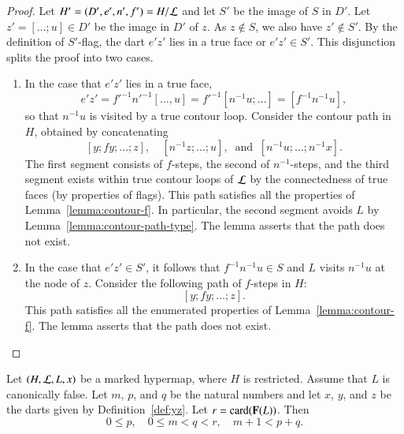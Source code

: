 \begin{proof}
  Let $H' = (D',e',n',f') = H/{\cal L}$ and let $S'$ be the image of
  $S$ in $D'$.  Let $z' = [\ldots;u]\in D'$ be the image in $D'$ of
  $z$.  As $z\not\in S$, we also have $z'\not\in S'$.  By the
  definition of $S'$-flag, the dart $e'z'$ lies in a true face or
  $e'z'\in S'$.  This disjunction splits the proof into two
  cases.
\begin{enumerate}
\item In the case that $e'z'$ lies in a true face, 
\[ 
e'z' = {f'}^{-1} {n'}^{-1} [\ldots,u] = {f'}^{-1} [n^{-1}u;\ldots]=[f^{-1}n^{-1}u],
\] 
so that $n^{-1} u$ is visited by a true contour loop.
Consider the contour
path in $H$, obtained by concatenating
\[ 
[y;fy;\ldots;z],\quad [n^{-1}z;\ldots;u],~\text{ and } ~ [n^{-1} u;\ldots;n^{-1} x].
\] 
The first segment consists of $f$-steps, the second of $n^{-1}$-steps,
and the third segment exists within true contour loops of ${\cal L}$
by the connectedness of true faces (by properties of flags).  This
path satisfies all the properties of Lemma~\ref{lemma:contour-f}.
In particular, the second segment avoids $L$ by Lemma~\ref{lemma:contour-path-type}.  
The lemma asserts that the path does not exist.
\item 
In the case that $e'z'\in S'$,  it follows that
$f^{-1}n^{-1}u \in S$ and $L$ visits $n^{-1} u$ at the node of $z$.
Consider the following path of $f$-steps in $H$:
\[ 
[y;f y;\ldots;z].
\] 
This path satisfies all the enumerated properties of
Lemma~\ref{lemma:contour-f}.   The lemma asserts that the path does not exist.
\end{enumerate}
\end{proof}

\begin{lemma}[parameters]\label{lemma:parameters}
Let $(H,{\cal L},L,x)$ be a
marked hypermap, where $H$ is restricted. Assume that $L$ is canonically false.
Let $m$, $p$, and $q$ be the natural numbers and let $x$, $y$, and $z$ be the darts given by
Definition~\ref{def:yz}.  Let $r = {\operatorname{card}}({\mathbf F}(L))$.  Then
\[ 
0\le p,\quad 0\le m < q < r,\quad m+1 < p+q.
\] 
\end{lemma}

